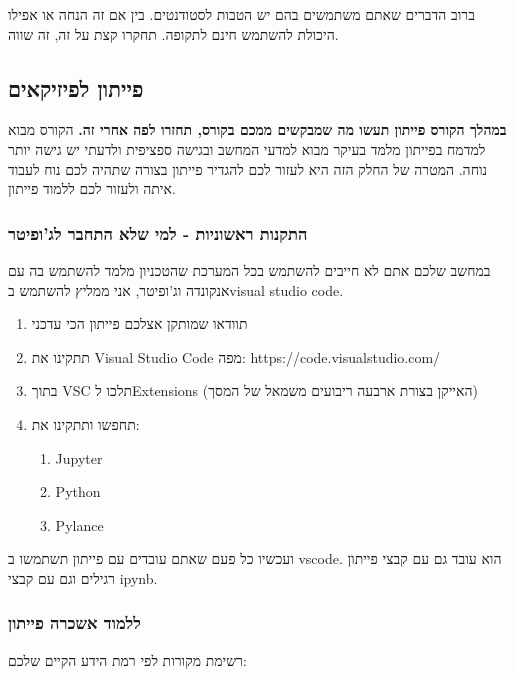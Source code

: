 \documentclass[a4paper,12pt]{article}
\begin{document}
ברוב הדברים שאתם משתמשים בהם יש הטבות לסטודנטים. בין אם זה הנחה או אפילו היכולת להשתמש חינם לתקופה. תחקרו קצת על זה, זה שווה.

\subsection{פייתון לפיזיקאים}\label{pythonlearn}

\textbf{במהלך הקורס פייתון תעשו מה שמבקשים ממכם בקורס, תחזרו לפה אחרי זה.} הקורס מבוא למדמח בפייתון מלמד בעיקר מבוא למדעי המחשב ובגישה ספציפית ולדעתי יש גישה יותר נוחה. המטרה של החלק הזה היא לעזור לכם להגדיר פייתון בצורה שתהיה לכם נוח לעבוד איתה ולעזור לכם ללמוד פייתון. 

\subsubsection{התקנות ראשוניות - למי שלא התחבר לג'ופיטר}

במחשב שלכם אתם לא חייבים להשתמש בכל המערכת שהטכניון מלמד להשתמש בה עם אנקונדה וג'ופיטר, אני ממליץ להשתמש ב\textenglish{visual studio code}.

\begin{enumerate}
    \item תוודאו שמותקן אצלכם פייתון הכי עדכני
    \item תתקינו את \textenglish{Visual Studio Code} מפה: https://code.visualstudio.com/
    \item בתוך \textenglish{VSC} תלכו ל\textenglish{Extensions} (האייקן בצורת ארבעה ריבועים משמאל של המסך)
    \item תחפשו ותתקינו את: \begin{enumerate}
        \item \textenglish{Jupyter}
        \item \textenglish{Python}
        \item \textenglish{Pylance}
    \end{enumerate}
\end{enumerate}

ועכשיו כל פעם שאתם עובדים עם פייתון תשתמשו ב \textenglish{vscode}. הוא עובד גם עם קבצי פייתון רגילים וגם עם קבצי \textenglish{ipynb}.

\subsubsection{ללמוד אשכרה פייתון}

רשימת מקורות לפי רמת הידע הקיים שלכם:
\end{document}
